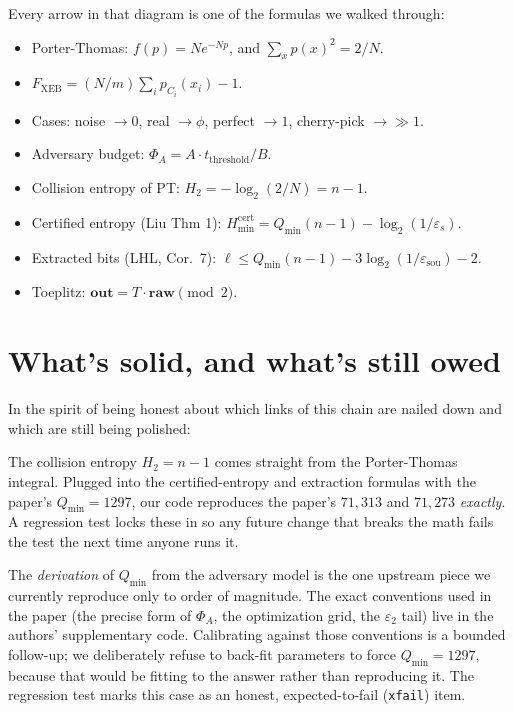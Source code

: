 \documentclass[11pt]{article}
\newcommand{\Fxeb}{F_{\text{XEB}}}
\newcommand{\Hmin}{H_{\min}}
\newcommand{\Qmin}{Q_{\min}}
\newcommand{\Phia}{\Phi_{\!A}}
\newcommand{\eps}{\varepsilon}
\newcommand{\epss}{\eps_{\!s}}
\newcommand{\epssou}{\eps_{\text{sou}}}
\begin{document}
Every arrow in that diagram is one of the formulas we walked through:

\begin{itemize}[leftmargin=2em, itemsep=2pt]
\item Porter-Thomas: $f(p) = N e^{-Np}$, and $\sum_x p(x)^2 = 2/N$.
\item $\Fxeb = (N/m)\sum_i p_{C_i}(x_i) - 1$.
\item Cases: noise $\to 0$, real $\to \phi$, perfect $\to 1$, cherry-pick $\to \gg 1$.
\item Adversary budget: $\Phia = A \cdot t_{\text{threshold}} / B$.
\item Collision entropy of PT: $H_2 = -\log_2(2/N) = n-1$.
\item Certified entropy (Liu Thm 1): $\Hmin^{\text{cert}} = \Qmin(n-1) - \log_2(1/\epss)$.
\item Extracted bits (LHL, Cor.\ 7): $\ell \leq \Qmin(n-1) - 3\log_2(1/\epssou) - 2$.
\item Toeplitz: $\mathbf{out} = T \cdot \mathbf{raw} \pmod 2$.
\end{itemize}

\section*{What's solid, and what's still owed}

In the spirit of being honest about which links of this chain are nailed down and which are still being polished:

\begin{description}[leftmargin=0pt, itemsep=4pt]
\item[Solid, derived from first principles.] The collision entropy $H_2 = n - 1$ comes straight from the Porter-Thomas integral. Plugged into the certified-entropy and extraction formulas with the paper's $\Qmin = 1297$, our code reproduces the paper's $71{,}313$ and $71{,}273$ \emph{exactly}. A regression test locks these in so any future change that breaks the math fails the test the next time anyone runs it.
\item[Still owed.] The \emph{derivation} of $\Qmin$ from the adversary model is the one upstream piece we currently reproduce only to order of magnitude. The exact conventions used in the paper (the precise form of $\Phia$, the optimization grid, the $\eps_2$ tail) live in the authors' supplementary code. Calibrating against those conventions is a bounded follow-up; we deliberately refuse to back-fit parameters to force $\Qmin = 1297$, because that would be fitting to the answer rather than reproducing it. The regression test marks this case as an honest, expected-to-fail (\texttt{xfail}) item.
\end{description}
\end{document}
